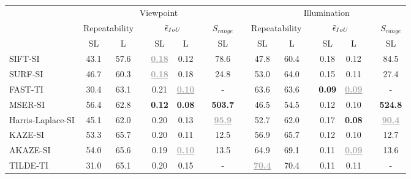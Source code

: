 \begin{landscape}
\begin{table}
\vspace{-0.10cm}
\begin{center}
\begin{tabular}{lccccccclccccccc}
\hline
\noalign{\smallskip}
\multicolumn{1}{c}{} & \multicolumn{7}{c}{Viewpoint} & \multicolumn{1}{c}{} & \multicolumn{7}{c}{Illumination} \\ 
\cline{2-8} \cline{10-16} \noalign{\smallskip}
\multicolumn{1}{c}{} & \multicolumn{2}{c}{Repeatability} && \multicolumn{2}{c}{$\Bar{\epsilon}_{IoU}$} && \multicolumn{1}{c}{$S_{range}$} & \multicolumn{1}{c}{} & \multicolumn{2}{c}{Repeatability} && \multicolumn{2}{c}{$\Bar{\epsilon}_{IoU}$} && \multicolumn{1}{c}{$S_{range}$} \\
\cline{2-3} \cline{5-6} \cline{8-8} \cline{10-11}  \cline{13-14} \cline{16-16} \noalign{\smallskip}
 & SL & L && SL & L && SL && SL & L && SL & L && SL \\
\noalign{\smallskip}
\hline
\noalign{\smallskip}
SIFT-SI \cite{SIFT}                    & 43.1 & 57.6 && \textbf{\textcolor{darkgray}{\underline{0.18}}} & 0.12 && 78.6 && 47.8 & 60.4 && 0.18 & 0.12 && 84.5 \\
SURF-SI \cite{SURF}                    & 46.7 & 60.3 && \textbf{\textcolor{darkgray}{\underline{0.18}}} & 0.18 && 24.8 && 53.0 & 64.0 && 0.15 & 0.11 && 27.4 \\
FAST-TI \cite{FAST}                    & 30.4 & 63.1 && 0.21 & \textbf{\textcolor{darkgray}{\underline{0.10}}} && - && 63.6 & 63.6 && \textbf{0.09} & \textbf{\textcolor{darkgray}{\underline{0.09}}} && - \\
MSER-SI \cite{MSER}                    & 56.4 & 62.8 && \textbf{0.12} & \textbf{0.08} && \textbf{503.7} && 46.5 & 54.5 && 0.12 & 0.10 && \textbf{524.8} \\
Harris-Laplace-SI \cite{HarrisLaplace} & 45.1 & 62.0 && 0.20 & 0.13 && \textbf{\textcolor{darkgray}{\underline{95.9}}} && 52.7 & 62.0 && 0.17 & \textbf{0.08} && \textbf{\textcolor{darkgray}{\underline{90.4}}} \\
KAZE-SI \cite{KAZE}                    & 53.3 & 65.7 && 0.20 & 0.11 && 12.5 && 56.9 & 65.7 && 0.12 & 0.10 && 12.7 \\
AKAZE-SI \cite{AKAZE}                  & 54.0 & 65.6 && 0.19 & \textbf{\textcolor{darkgray}{\underline{0.10}}} && 13.5 && 64.9 & 69.1 && 0.11 & \textbf{\textcolor{darkgray}{\underline{0.09}}} && 13.6 \\
TILDE-TI \cite{TILDE}                  & 31.0 & 65.1 && 0.20 & 0.15 && - && \textbf{\textcolor{darkgray}{\underline{70.4}}} & 70.4 && 0.11 & 0.11 && - \\

\end{tabular}
\end{center}
\end{table}
\end{landscape}
